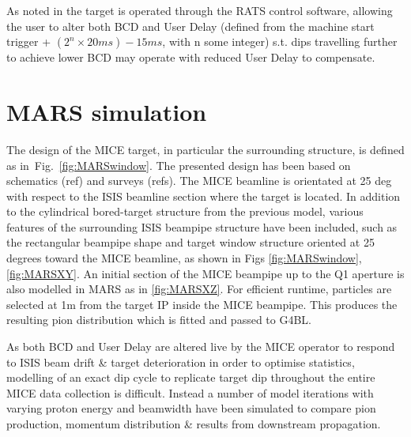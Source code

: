 \documentclass[a4paper,11pt]{article}
\begin{document}
As noted in \cite{micenote480} the target is operated through the RATS control software, allowing the user to alter both BCD and User Delay (defined from the machine start trigger + $(2^{n}\times20ms)-15ms$, with n some integer) s.t. dips travelling further to achieve lower BCD may operate with reduced User Delay to compensate. 

\section{MARS simulation}

The design of the MICE target, in particular the surrounding structure, is defined as in~Fig.~\ref{fig:MARSwindow}. The presented design has been based on schematics (ref) and surveys (refs). The MICE beamline is orientated at 25 deg with respect to the ISIS beamline section where the target is located. In addition to the cylindrical bored-target structure from the previous model, various features of the surrounding ISIS beampipe structure have been included, such as the rectangular beampipe shape and target window structure oriented at 25 degrees toward the MICE beamline, as shown in Figs \ref{fig:MARSwindow}, \ref{fig:MARSXY}. An initial section of the MICE beampipe up to the Q1 aperture is also modelled in MARS as in \ref{fig:MARSXZ}. For efficient runtime, particles are selected at 1m from the target IP inside the MICE beampipe. This produces the resulting pion distribution which is fitted and passed to G4BL.

As both BCD and User Delay are altered live by the MICE operator to respond to ISIS beam drift \& target deterioration in order to optimise statistics, modelling of an exact dip cycle to replicate target dip throughout the entire MICE data collection is difficult. Instead a number of model iterations with varying proton energy and beamwidth have been simulated to compare pion production, momentum distribution \& results from downstream propagation. 
\end{document}

